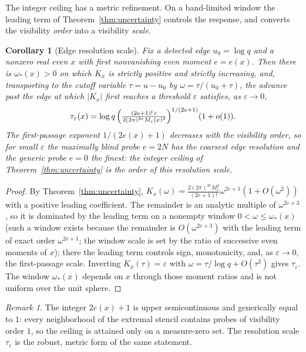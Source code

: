 \documentclass[11pt]{article}
\theoremstyle{plain}
\newtheorem{corollary}[theorem]{Corollary}
\theoremstyle{definition}
\theoremstyle{remark}
\newtheorem{remark}[theorem]{Remark}
\begin{document}
The integer ceiling has a metric refinement. On a band-limited window the leading
term of Theorem~\ref{thm:uncertainty} controls the response, and converts the
visibility \emph{order} into a visibility \emph{scale}.

\begin{corollary}[Edge resolution scale]\label{cor:resolution}
Fix a detected edge $u_0=\log q$ and a nonzero real even $x$ with first
nonvanishing even moment $e=e(x)$. Then there is $\omega_*(x)>0$ on which $K_x$ is
strictly positive and strictly increasing, and, transporting to the cutoff
variable $\tau=u-u_0$ by $\omega=\tau/(u_0+\tau)$, the advance past the edge at
which $|K_x|$ first reaches a threshold $\varepsilon$ satisfies, as
$\varepsilon\to0$,
\[
        \tau_\varepsilon(x)=\log q\,
        \Bigl(\tfrac{(2e+1)!\,\varepsilon}{2(2\pi)^{2e}M_e(x)^2}\Bigr)^{1/(2e+1)}
        (1+o(1)).
\]
The first-passage exponent $1/(2e(x)+1)$ decreases with the visibility order, so
for small $\varepsilon$ the maximally blind probe $e=2N$ has the coarsest edge
resolution and the generic probe $e=0$ the finest: the integer ceiling of
Theorem~\ref{thm:uncertainty} is the order of this resolution scale.
\end{corollary}

\begin{proof}
By Theorem~\ref{thm:uncertainty},
$K_x(\omega)=\tfrac{2(2\pi)^{2e}M_e^2}{(2e+1)!}\omega^{2e+1}(1+O(\omega^2))$ with a
positive leading coefficient. The remainder is an analytic multiple of
$\omega^{2e+3}$, so it is dominated by the leading term on a nonempty window
$0<\omega\le\omega_*(x)$ (such a window exists because the remainder is
$O(\omega^{2e+3})$ with the leading term of exact order $\omega^{2e+1}$; the
window scale is set by the ratio of successive even moments of $x$);
there the leading term controls sign, monotonicity, and, as $\varepsilon\to0$,
the first-passage scale. Inverting $K_x(\tau)=\varepsilon$ with
$\omega=\tau/\log q+O(\tau^2)$ gives $\tau_\varepsilon$. The window $\omega_*(x)$
depends on $x$ through those moment ratios and is not uniform over the unit
sphere.
\end{proof}

\begin{remark}
The integer $2e(x)+1$ is upper semicontinuous and generically equal to $1$: every
neighborhood of the extremal stencil contains probes of visibility order $1$, so
the ceiling is attained only on a measure-zero set. The resolution scale
$\tau_\varepsilon$ is the robust, metric form of the same statement.
\end{remark}
\end{document}

